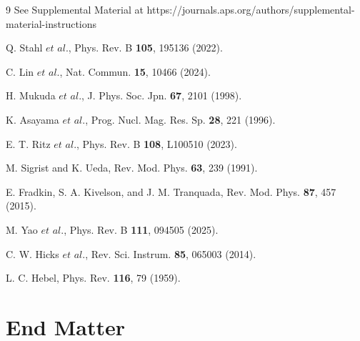 \documentclass[aps,prl,twocolumn,superscriptaddress]{revtex4-2}
\begin{document}
\begin{thebibliography}{9}
See Supplemental Material at https://journals.aps.org/authors/supplemental-material-instructions

Q. Stahl $et$ $al$., Phys. Rev. B {\bf 105}, 195136 (2022).

C. Lin $et$ $al$., Nat. Commun. {\bf 15}, 10466 (2024).

H. Mukuda $et$ $al$., J. Phys. Soc. Jpn. {\bf 67}, 2101 (1998).

K. Asayama $et$ $al$., Prog. Nucl. Mag. Res. Sp. {\bf 28}, 221 (1996).

E. T. Ritz $et$ $al$., Phys. Rev. B {\bf 108}, L100510 (2023).

M. Sigrist and K. Ueda,  Rev. Mod. Phys. {\bf 63}, 239 (1991).

 E. Fradkin, S. A. Kivelson, and J. M. Tranquada,  Rev. Mod. Phys. {\bf 87}, 457 (2015).

M. Yao $et$ $al$., Phys. Rev. B {\bf 111}, 094505 (2025).


C. W. Hicks $et$ $al$., Rev. Sci. Instrum. {\bf 85}, 065003 (2014).

 L. C. Hebel, Phys. Rev. {\bf 116}, 79 (1959).



\end{thebibliography}


\section{End Matter}
\end{document}
